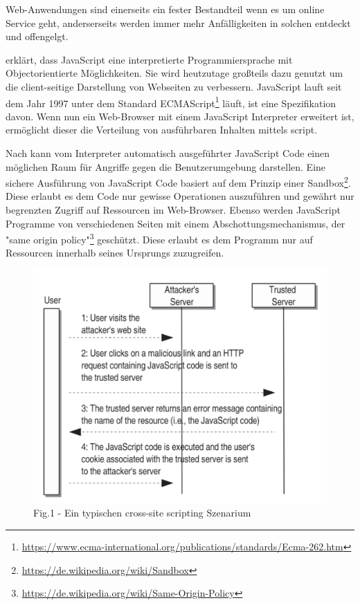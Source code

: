 

Web-Anwendungen sind einerseits ein fester Bestandteil wenn es um online Service geht, anderserseits werden immer mehr Anfälligkeiten in solchen entdeckt und offengelgt. \autocite[1]{kirda2009}


\textcite[4]{flanagan2006} erklärt, dass JavaScript eine interpretierte Programmiersprache mit Objectorientierte Möglichkeiten. Sie wird heutzutage großteils dazu genutzt um die client-seitige Darstellung von Webseiten zu verbessern.
JavaScript lauft seit dem Jahr 1997 unter dem Standard ECMAScript\footnote{\url{https://www.ecma-international.org/publications/standards/Ecma-262.htm}} läuft, ist eine Spezifikation davon. Wenn nun ein Web-Browser mit einem JavaScript Interpreter erweitert ist, ermöglicht dieser die Verteilung von ausführbaren Inhalten mittels script.

Nach \textcite[1]{kirda2009} kann vom Interpreter automatisch ausgeführter JavaScript Code einen möglichen Raum für Angriffe gegen die Benutzerumgebung darstellen. Eine sichere Ausführung von JavaScript Code basiert auf dem Prinzip einer Sandbox\footnote{\url{https://de.wikipedia.org/wiki/Sandbox}}. Diese erlaubt es dem Code nur gewisse Operationen auszuführen und gewährt nur begrenzten Zugriff auf Ressourcen im Web-Browser. Ebenso werden JavaScript Programme von verschiedenen Seiten mit einem Abschottungsmechanismus, der "same origin policy"\footnote{\url{https://de.wikipedia.org/wiki/Same-Origin-Policy}} geschützt. Diese erlaubt es dem Programm nur auf Ressourcen innerhalb seines Ursprungs zuzugreifen.

\begin{figure}[ht]
	\centering
	\includegraphics[width=0.5\linewidth]{images/cross-site-scripting_scenario-kirda2009_p2.png}
	\caption{Fig.1 - Ein typischen cross-site scripting Szenarium\autocite[p]{kirda2009}}
\end{figure}

